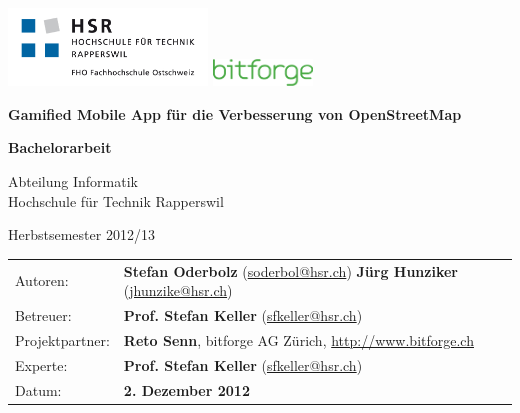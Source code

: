 \begin{titlepage}

\includegraphics[width=200px]{images/titlepage/logo-hsr}
\hfill
\includegraphics[width=100px]{images/titlepage/logo-bitforge}
\vspace{2.2cm}

\begin{center}
{ \Large
	\textbf{Gamified Mobile App für die Verbesserung von OpenStreetMap}
	\vspace{1cm}

	\textbf{Bachelorarbeit}
	\vspace{1cm}

	Abteilung Informatik \\[0.2cm]
	Hochschule für Technik Rapperswil
	\vspace{1cm}

	Herbstsemester 2012/13
}
\end{center}
\vspace{2.3cm}

\begin{tabular}{p{0.19\twocelltabwidth}p{0.81\twocelltabwidth}}
Autoren: & \textbf{Stefan Oderbolz} (\url{soderbol@hsr.ch}) \newline
 \textbf{Jürg Hunziker} (\url{jhunzike@hsr.ch}) \\ 
Betreuer: & \textbf{Prof. Stefan Keller} (\url{sfkeller@hsr.ch}) \\ 
Projektpartner: & \textbf{Reto Senn}, bitforge AG Zürich, \url{http://www.bitforge.ch} \\ 
Experte: & \textbf{Prof. Stefan Keller} (\url{sfkeller@hsr.ch}) \\ 
Datum: & \textbf{2. Dezember 2012} \\ 
\end{tabular}

\end{titlepage}